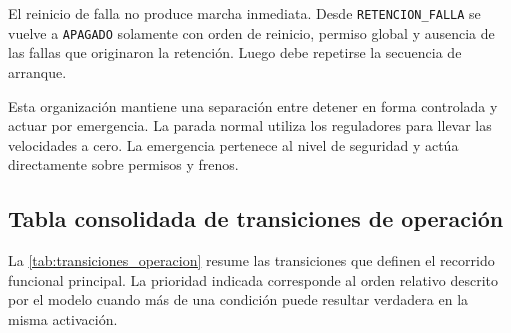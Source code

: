 \documentclass[a4paper,10pt,onecolumn,journal]{ieeeconf}
\numberwithin{equation}{section}
\begin{document}
El reinicio de falla no produce marcha inmediata. Desde \texttt{RETENCION\_FALLA} se vuelve a \texttt{APAGADO} solamente con orden de reinicio, permiso global y ausencia de las fallas que originaron la retención. Luego debe repetirse la secuencia de arranque.

Esta organización mantiene una separación entre detener en forma controlada y actuar por emergencia. La parada normal utiliza los reguladores para llevar las velocidades a cero. La emergencia pertenece al nivel de seguridad y actúa directamente sobre permisos y frenos.

\subsection{Tabla consolidada de transiciones de operación}
La \cref{tab:transiciones_operacion} resume las transiciones que definen el recorrido funcional principal. La prioridad indicada corresponde al orden relativo descrito por el modelo cuando más de una condición puede resultar verdadera en la misma activación.
\end{document}
